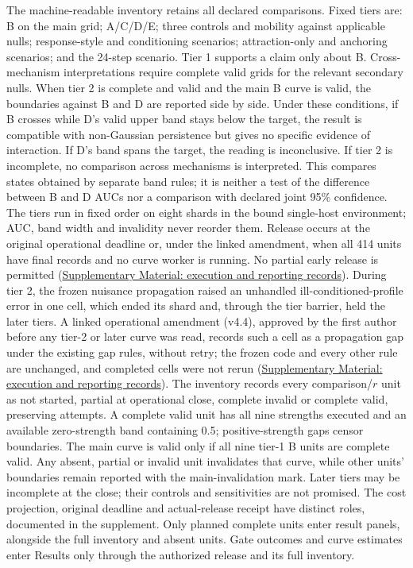 The machine-readable inventory retains all declared comparisons. %
Fixed tiers are: B on the main grid; A/C/D/E; three controls and mobility against applicable nulls; response-style and conditioning scenarios; attraction-only and anchoring scenarios; and the 24-step scenario. %
Tier 1 supports a claim only about B. %
Cross-mechanism interpretations require complete valid grids for the relevant secondary nulls. %
When tier 2 is complete and valid and the main B curve is valid, the boundaries against B and D are reported side by side. Under these conditions, if B crosses while D's valid upper band stays below the target, the result is compatible with non-Gaussian persistence but gives no specific evidence of interaction. If D's band spans the target, the reading is inconclusive. If tier 2 is incomplete, no comparison across mechanisms is interpreted. %
This compares states obtained by separate band rules; it is neither a test of the difference between B and D AUCs nor a comparison with declared joint 95\% confidence. %
The tiers run in fixed order on eight shards in the bound single-host environment; AUC, band width and invalidity never reorder them. Release occurs at the original operational deadline or, under the linked amendment, when all 414 units have final records and no curve worker is running. No partial early release is permitted (\hyperref[supp:execution-records]{Supplementary Material: execution and reporting records}). %
During tier 2, the frozen nuisance propagation raised an unhandled ill-conditioned-profile error in one cell, which ended its shard and, through the tier barrier, held the later tiers. A linked operational amendment (v4.4), approved by the first author before any tier-2 or later curve was read, records such a cell as a propagation gap under the existing gap rules, without retry; the frozen code and every other rule are unchanged, and completed cells were not rerun (\hyperref[supp:execution-records]{Supplementary Material: execution and reporting records}). %
The inventory records every comparison/$r$ unit as not started, partial at operational close, complete invalid or complete valid, preserving attempts. A complete valid unit has all nine strengths executed and an available zero-strength band containing 0.5; positive-strength gaps censor boundaries. The main curve is valid only if all nine tier-1 B units are complete valid. Any absent, partial or invalid unit invalidates that curve, while other units' boundaries remain reported with the main-invalidation mark. %
Later tiers may be incomplete at the close; their controls and sensitivities are not promised. The cost projection, original deadline and actual-release receipt have distinct roles, documented in the supplement. %
Only planned complete units enter result panels, alongside the full inventory and absent units. %
Gate outcomes and curve estimates enter Results only through the authorized release and its full inventory. %


